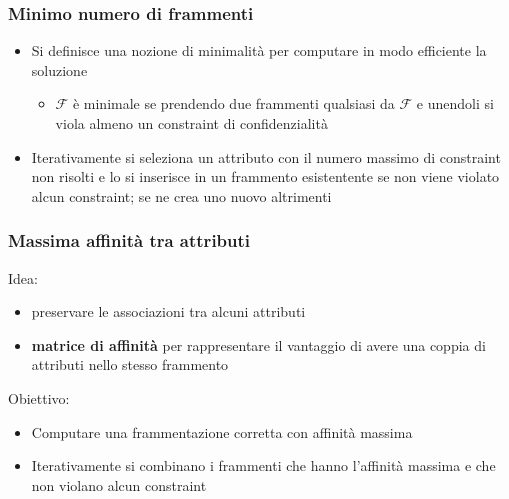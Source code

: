 \documentclass{report}
\begin{document}
\subsubsection{Minimo numero di frammenti}
\begin{itemize}
    \item Si definisce una nozione di minimalità per computare in modo efficiente la soluzione
    \begin{itemize}
        \item $\mathcal{F}$ è minimale se prendendo due frammenti qualsiasi da $\mathcal{F}$ e unendoli si viola almeno un constraint di confidenzialità
    \end{itemize}
    \item Iterativamente si seleziona un attributo con il numero massimo di constraint non risolti e lo si inserisce 
    in un frammento esistentente se non viene violato alcun constraint; se ne crea uno nuovo altrimenti
\end{itemize}

\subsubsection{Massima affinità tra attributi}
Idea:
\begin{itemize}
    \item preservare le associazioni tra alcuni attributi 
    \item \textbf{matrice di affinità} per rappresentare il vantaggio di avere una coppia 
    di attributi nello stesso frammento
\end{itemize}

Obiettivo: 
\begin{itemize}
    \item Computare una frammentazione corretta con affinità massima 
    \item Iterativamente si combinano i frammenti che hanno l'affinità massima e che non violano alcun constraint
\end{itemize}
\end{document}
